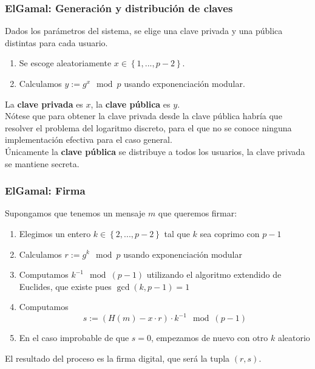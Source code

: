 \documentclass{beamer}
\begin{document}
\begin{frame}
    \frametitle{ElGamal: Generación y distribución de claves}

    Dados los parámetros del sistema, se elige una clave privada y una pública distintas para cada usuario.

    \begin{enumerate}
        \item Se escoge aleatoriamente $x \in \left\{1, ..., p-2\right\}$.
        \item Calculamos $y := g^x \mod p$ usando exponenciación modular.
    \end{enumerate}

    La \textbf{clave privada} es $x$, la \textbf{clave pública} es $y$.
    \\[10pt]
    Nótese que para obtener la clave privada desde la clave pública habría que resolver el problema del \alert{logaritmo discreto}, para el que no se conoce ninguna implementación efectiva para el caso general.
    \\[10pt]
    Únicamente la \textbf{clave pública} se distribuye a todos los usuarios, la clave privada se mantiene secreta.
\end{frame}


\begin{frame}
    \frametitle{ElGamal: Firma}

    Supongamos que tenemos un mensaje $m$ que queremos firmar:

    \begin{enumerate}
        \item Elegimos un entero $k \in \left\{2, ..., p-2\right\}$ tal que $k$ sea coprimo con $p-1$ 
        \item Calculamos $r := g^k \mod p$ usando exponenciación modular
        \item Computamos $k^{-1} \mod \left(p-1\right)$ utilizando el algoritmo extendido de Euclides, que existe pues $\gcd(k, p-1) = 1$
        \item Computamos $$s := \left( H(m) - x \cdot r  \right) \cdot k^{-1} \mod \left(p-1\right)$$
        \item En el caso improbable de que $s=0$, empezamos de nuevo con otro $k$ aleatorio
    \end{enumerate}

    El resultado del proceso es la firma digital, que será la tupla $(r, s)$.

\end{frame}
\end{document}
